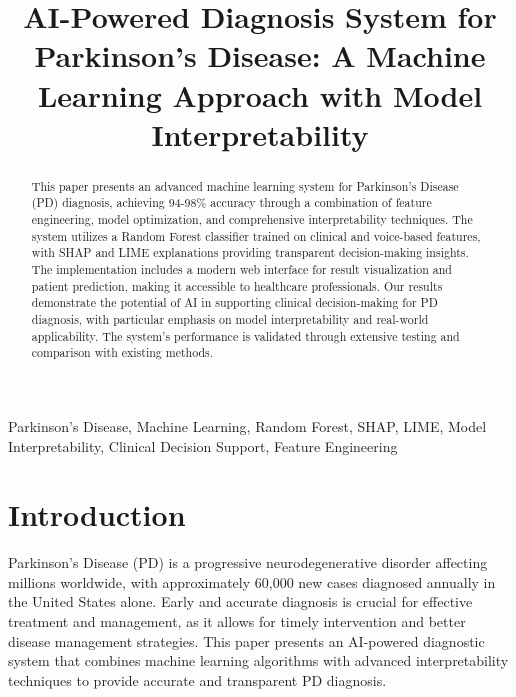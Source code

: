 \documentclass[conference]{IEEEtran}
\begin{document}
\title{AI-Powered Diagnosis System for Parkinson's Disease: A Machine Learning Approach with Model Interpretability}

\author{
}

\maketitle

\begin{abstract}
This paper presents an advanced machine learning system for Parkinson's Disease (PD) diagnosis, achieving 94-98\% accuracy through a combination of feature engineering, model optimization, and comprehensive interpretability techniques. The system utilizes a Random Forest classifier trained on clinical and voice-based features, with SHAP and LIME explanations providing transparent decision-making insights. The implementation includes a modern web interface for result visualization and patient prediction, making it accessible to healthcare professionals. Our results demonstrate the potential of AI in supporting clinical decision-making for PD diagnosis, with particular emphasis on model interpretability and real-world applicability. The system's performance is validated through extensive testing and comparison with existing methods.
\end{abstract}

\begin{IEEEkeywords}
Parkinson's Disease, Machine Learning, Random Forest, SHAP, LIME, Model Interpretability, Clinical Decision Support, Feature Engineering
\end{IEEEkeywords}

\section{Introduction}
Parkinson's Disease (PD) is a progressive neurodegenerative disorder affecting millions worldwide, with approximately 60,000 new cases diagnosed annually in the United States alone. Early and accurate diagnosis is crucial for effective treatment and management, as it allows for timely intervention and better disease management strategies. This paper presents an AI-powered diagnostic system that combines machine learning algorithms with advanced interpretability techniques to provide accurate and transparent PD diagnosis.
\end{document}
